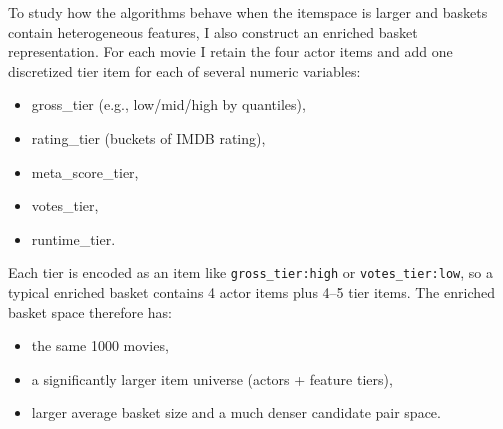 \documentclass{article}  %
\begin{document}
To study how the algorithms behave when the itemspace is larger and baskets contain heterogeneous features, I also construct an enriched basket representation. For each movie I retain the four actor items and add one discretized tier item for each of several numeric variables:

\begin{itemize}
    \item gross\_tier (e.g., low/mid/high by quantiles),
    \item rating\_tier (buckets of IMDB rating),
    \item meta\_score\_tier,
    \item votes\_tier,
    \item runtime\_tier.
\end{itemize}

Each tier is encoded as an item like \verb|gross_tier:high| or \verb|votes_tier:low|, so a typical enriched basket contains 4 actor items plus 4--5 tier items. The enriched basket space therefore has:

\begin{itemize}
    \item the same 1000 movies,
    \item a significantly larger item universe (actors + feature tiers),
    \item larger average basket size and a much denser candidate pair space.
\end{itemize}
\end{document}
